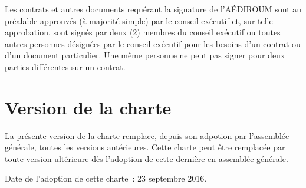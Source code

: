 \documentclass{aediroum}
\begin{document}
Les contrats et autres documents requérant la signature de l'AÉDIROUM sont au préalable approuvés (à majorité simple) par le conseil exécutif et, sur telle approbation, sont signés par deux (2) membres du conseil exécutif ou toutes autres personnes désignées par le conseil exécutif pour les besoins d'un contrat ou d'un document particulier. Une même personne ne peut pas signer pour deux parties différentes sur un contrat.

\section{Version de la charte}\label{sec:version-de-la-charte}
La présente version de la charte remplace, depuis son adpotion par l'assemblée générale, toutes les versions antérieures. Cette charte peut être remplacée par toute version ultérieure dès l'adoption de cette dernière en assemblée générale.

Date de l'adoption de cette charte~: 23 septembre 2016.
\end{document}
